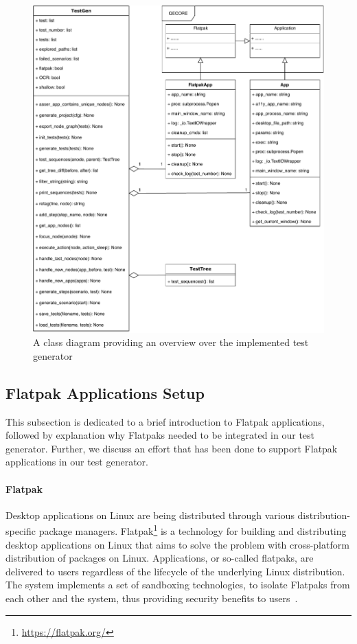 \begin{figure}[htb!]
	\centering
	\includegraphics[width=1\textwidth,clip]{obrazky-figures/TestGen_class_diagram.pdf}
	\caption{A class diagram providing an overview over the implemented test generator}
	\label{test_gen}
\end{figure}

\subsection{Flatpak Applications Setup}\label{flatpak_setup}

This subsection is dedicated to a brief introduction to Flatpak applications, followed by explanation why Flatpaks needed to be integrated in our test generator. Further, we discuss an effort that has been done to support Flatpak applications in our test generator.

\paragraph{Flatpak} Desktop applications on Linux are being distributed through various distribution-specific package managers. Flatpak\footnote{\url{https://flatpak.org/}} is a technology for building and distributing desktop applications on Linux that aims to solve the problem with cross-platform distribution of packages on Linux. Applications, or so-called flatpaks, are delivered to users regardless of the lifecycle of the underlying Linux distribution. The system implements a set of sandboxing technologies, to isolate Flatpaks from each other and the system, thus providing security benefits to users~\cite{flatpak}.

